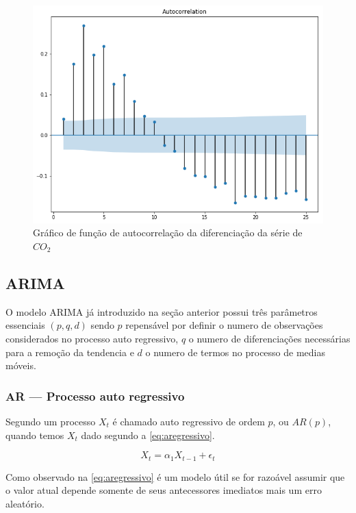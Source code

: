 \documentclass[
    12pt,
    oneside,
    a4paper,
    english,
    brazil
]{abntex2}
\begin{document}
\begin{figure}
    \centering
    \caption{Gráfico de função de autocorrelação da diferenciação da série de
        $CO_2$}\label{fig:acfco2diff}
    \includegraphics[width=.6\linewidth]{images/acf_co2_diff.png}
\end{figure}


\subsection{ARIMA}

O modelo ARIMA já introduzido na seção anterior possui três parâmetros
essenciais $(p,q,d)$ sendo $p$ repensável por definir o numero de observações
considerados no processo auto regressivo, $q$ o numero de diferenciações
necessárias para a remoção da tendencia e $d$ o numero de termos no processo de
medias móveis.

\subsubsection{AR --- Processo auto regressivo}


Segundo    um  processo  $X_t$  é  chamado  auto  regressivo
de   ordem   $p$,   ou   $AR(p)$,   quando   temos   $X_t$   dado   segundo   a
\autoref{eq:aregressivo}.

\begin{equation}
    \label{eq:aregressivo}
    X_t = \alpha_1X_{t-1}+\epsilon_t
\end{equation}

Como observado  na \autoref{eq:aregressivo}  é um modelo  útil se  for razoável
assumir que o  valor atual depende somente de seus  antecessores imediatos mais
um erro aleatório.
\end{document}
